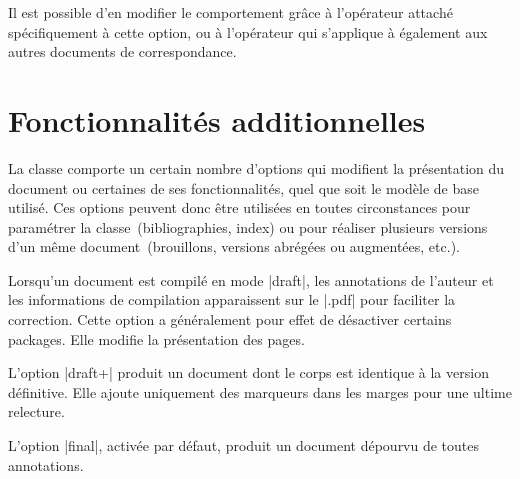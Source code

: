 \begin{developer}
Il est possible d'en modifier le comportement grâce à l'opérateur  attaché spécifiquement à cette option, ou à l'opérateur  qui s'applique à également aux autres documents de correspondance.
\end{developer}

\begin{noprint}
\end{noprint}



\section{Fonctionnalités additionnelles}

La classe \frenchlaw comporte un certain nombre d'options qui modifient la présentation du document ou certaines de ses fonctionnalités, quel que soit le modèle de base utilisé. Ces options peuvent donc être utilisées en toutes circonstances pour paramétrer la classe~(bibliographies, index) ou pour réaliser plusieurs versions d'un même document~(brouillons, versions abrégées ou augmentées, etc.).

Lorsqu'un document est compilé en mode |draft|, les annotations de l'auteur et les informations de compilation apparaissent sur le |.pdf| pour faciliter la correction. Cette option a généralement pour effet de désactiver certains packages. Elle modifie la présentation des pages.\par
L'option |draft+| produit un document dont le corps est identique à la version définitive. Elle ajoute uniquement des marqueurs dans les marges pour une ultime relecture.\par
L'option |final|, activée par défaut, produit un document dépourvu de toutes annotations.

